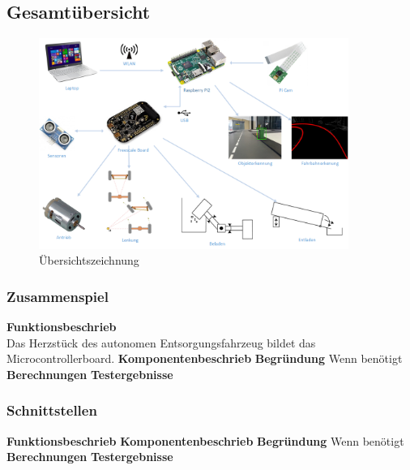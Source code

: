 \subsection{Gesamtübersicht}

\begin{figure}[h!]%
\centering
\includegraphics[width=0.9\textwidth]{03_Loesungskonzept/pictures/uebersichtszeichnung.png}
\caption{Übersichtszeichnung}
\label{fig:Java}
\end{figure}

\subsubsection{Zusammenspiel}
\textbf{Funktionsbeschrieb}\\[0.2cm]
Das Herzstück des autonomen Entsorgungsfahrzeug bildet das Microcontrollerboard. 
\textbf{Komponentenbeschrieb}
\textbf{Begründung}
Wenn benötigt
\textbf{Berechnungen}
\textbf{Testergebnisse}

\subsubsection{Schnittstellen}
\textbf{Funktionsbeschrieb}
\textbf{Komponentenbeschrieb}
\textbf{Begründung}
Wenn benötigt
\textbf{Berechnungen}
\textbf{Testergebnisse}